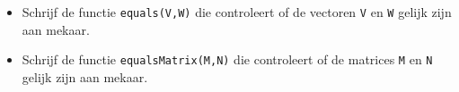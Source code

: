 \begin{oef}
\begin{itemize}
  \item Schrijf de functie \verb/equals(V,W)/ die controleert of de vectoren \verb/V/ en \verb/W/ gelijk zijn aan mekaar.
  \item Schrijf de functie \verb/equalsMatrix(M,N)/ die controleert of de matrices \verb/M/ en \verb/N/ gelijk zijn aan mekaar.
\end{itemize}
\begin{opl}
\end{opl}
\end{oef}


